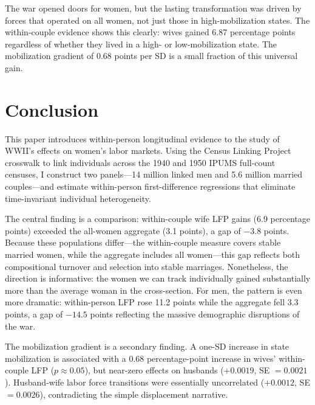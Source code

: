 \documentclass[12pt]{article}
\begin{document}
The war opened doors for women, but the lasting transformation was driven by forces that operated on all women, not just those in high-mobilization states. The within-couple evidence shows this clearly: wives gained 6.87 percentage points regardless of whether they lived in a high- or low-mobilization state. The mobilization gradient of 0.68 points per SD is a small fraction of this universal gain.



\section{Conclusion}
\label{sec:conclusion}

This paper introduces within-person longitudinal evidence to the study of WWII's effects on women's labor markets. Using the Census Linking Project crosswalk \citep{abramitzky2025clp} to link individuals across the 1940 and 1950 IPUMS full-count censuses, I construct two panels---14 million linked men and 5.6 million married couples---and estimate within-person first-difference regressions that eliminate time-invariant individual heterogeneity.

The central finding is a comparison: within-couple wife LFP gains (6.9 percentage points) exceeded the all-women aggregate (3.1 points), a gap of $-3.8$ points. Because these populations differ---the within-couple measure covers stable married women, while the aggregate includes all women---this gap reflects both compositional turnover and selection into stable marriages. Nonetheless, the direction is informative: the women we can track individually gained substantially more than the average woman in the cross-section. For men, the pattern is even more dramatic: within-person LFP rose 11.2 points while the aggregate fell 3.3 points, a gap of $-14.5$ points reflecting the massive demographic disruptions of the war.

The mobilization gradient is a secondary finding. A one-SD increase in state mobilization is associated with a 0.68 percentage-point increase in wives' within-couple LFP ($p \approx 0.05$), but near-zero effects on husbands ($+0.0019$, SE $= 0.0021$). Husband-wife labor force transitions were essentially uncorrelated ($+0.0012$, SE $= 0.0026$), contradicting the simple displacement narrative.
\end{document}
